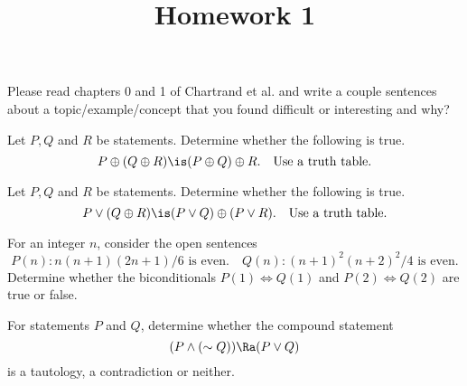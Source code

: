 \documentclass{homework}
\title{Homework 1}
\begin{document}
 \maketitle

\question Please read chapters 0 and 1 of Chartrand et al. and write a couple sentences about a topic/example/concept that you found difficult or interesting and why?

\question\label{a} Let $P, Q$ and $R$ be statements. Determine whether the following is true.
\[
    P \oplus (Q \oplus R) \is (P \oplus Q) \oplus R. \quad \text{Use a truth table.}
\]

\question Let $P, Q$ and $R$ be statements. Determine whether the following is true.
\[
    P \vee (Q \oplus R) \is (P \vee Q) \oplus (P \vee R). \quad \text{Use a truth table.}
\]


\question For an integer $n$, consider the open sentences
\[
    P(n): n(n + 1)(2n + 1)/6\text{ is even.} \quad Q(n): (n + 1)^2 (n + 2)^2 /4\text{ is even.}
\]
Determine whether the biconditionals $P(1) \iff Q(1)$ and $P(2) \iff Q(2)$ are true or false.


\question For statements $P$ and $Q$, determine whether the compound statement
\[
    (P \wedge (\sim Q)) \Ra (P \vee Q)
\]
is a tautology, a contradiction or neither.
\end{document}
